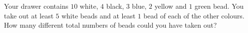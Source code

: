 Your drawer contains $10$ white, $4$ black, $3$ blue, $2$ yellow and $1$ green bead. You take out at least $5$ white beads and at least $1$ bead of each of the other colours. How many different total numbers of beads could you have taken out?

